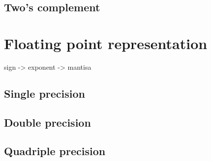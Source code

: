 \documentclass{ook}
\begin{document}
\subsection{Two's complement}

\section{Floating point representation}

sign -> exponent -> mantisa

\subsection{Single precision}

\subsection{Double precision}

\subsection{Quadriple precision}
\end{document}
